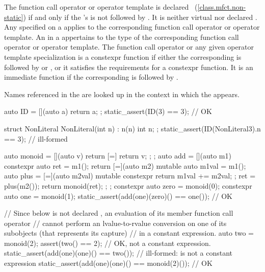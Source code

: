 \pnum
The function call operator or operator template is declared
~(\ref{class.mfct.non-static}) if and only if the
's  is not
followed by . It is neither virtual nor declared . Any
 specified on a 
applies to the corresponding function call operator or operator template.
An  in a  appertains
to the type of the corresponding function call operator or operator template.
The function call operator or any given operator template specialization
is a constexpr function if either
the corresponding 
is followed by  or , or
it satisfies the requirements for a constexpr function.
It is an immediate function
if the corresponding 
 is followed by .
\begin{note}
Names referenced in
the  are looked up in the context in which the
 appears.
\end{note}
\begin{example}
\begin{codeblock}
auto ID = [](auto a) { return a; };
static_assert(ID(3) == 3);                      // OK

struct NonLiteral {
  NonLiteral(int n) : n(n) { }
  int n;
};
static_assert(ID(NonLiteral{3}).n == 3);        // ill-formed
\end{codeblock}
\end{example}

\pnum
\begin{example}
\begin{codeblock}
auto monoid = [](auto v) { return [=] { return v; }; };
auto add = [](auto m1) constexpr {
  auto ret = m1();
  return [=](auto m2) mutable {
    auto m1val = m1();
    auto plus = [=](auto m2val) mutable constexpr
                   { return m1val += m2val; };
    ret = plus(m2());
    return monoid(ret);
  };
};
constexpr auto zero = monoid(0);
constexpr auto one = monoid(1);
static_assert(add(one)(zero)() == one());       // OK

// Since  below is not declared , an evaluation of its  member function call operator
// cannot perform an lvalue-to-rvalue conversion on one of its subobjects (that represents its capture)
// in a constant expression.
auto two = monoid(2);
assert(two() == 2); // OK, not a constant expression.
static_assert(add(one)(one)() == two());        // ill-formed:  is not a constant expression
static_assert(add(one)(one)() == monoid(2)());  // OK
\end{codeblock}
\end{example}

